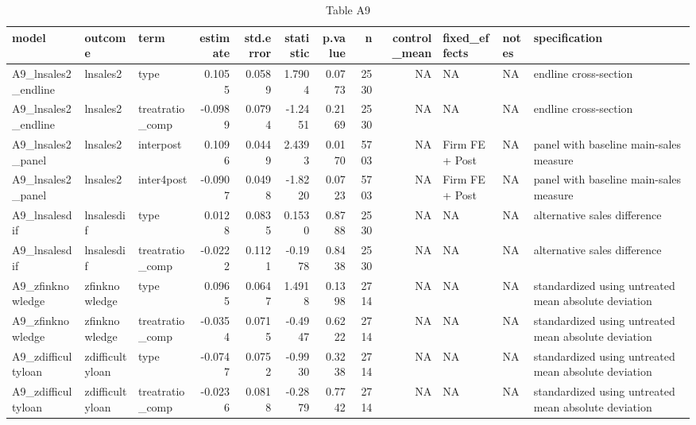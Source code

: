 \begin{table}

\caption{Table A9}
\centering
\begin{tabular}[t]{lllrrrrrrlll}
\toprule
model & outcome & term & estimate & std.error & statistic & p.value & n & control\_mean & fixed\_effects & notes & specification\\
\midrule
A9\_lnsales2\_endline & lnsales2 & type & 0.1055 & 0.0589 & 1.7904 & 0.0773 & 2530 & NA & NA & NA & endline cross-section\\
A9\_lnsales2\_endline & lnsales2 & treatratio\_comp & -0.0989 & 0.0794 & -1.2451 & 0.2169 & 2530 & NA & NA & NA & endline cross-section\\
A9\_lnsales2\_panel & lnsales2 & interpost & 0.1096 & 0.0449 & 2.4393 & 0.0170 & 5703 & NA & Firm FE + Post & NA & panel with baseline main-sales measure\\
A9\_lnsales2\_panel & lnsales2 & inter4post & -0.0907 & 0.0498 & -1.8220 & 0.0723 & 5703 & NA & Firm FE + Post & NA & panel with baseline main-sales measure\\
A9\_lnsalesdif & lnsalesdif & type & 0.0128 & 0.0835 & 0.1530 & 0.8788 & 2530 & NA & NA & NA & alternative sales difference\\
\addlinespace
A9\_lnsalesdif & lnsalesdif & treatratio\_comp & -0.0222 & 0.1121 & -0.1978 & 0.8438 & 2530 & NA & NA & NA & alternative sales difference\\
A9\_zfinknowledge & zfinknowledge & type & 0.0965 & 0.0647 & 1.4918 & 0.1398 & 2714 & NA & NA & NA & standardized using untreated mean absolute deviation\\
A9\_zfinknowledge & zfinknowledge & treatratio\_comp & -0.0354 & 0.0715 & -0.4947 & 0.6222 & 2714 & NA & NA & NA & standardized using untreated mean absolute deviation\\
A9\_zdifficultyloan & zdifficultyloan & type & -0.0747 & 0.0752 & -0.9930 & 0.3238 & 2714 & NA & NA & NA & standardized using untreated mean absolute deviation\\
A9\_zdifficultyloan & zdifficultyloan & treatratio\_comp & -0.0236 & 0.0818 & -0.2879 & 0.7742 & 2714 & NA & NA & NA & standardized using untreated mean absolute deviation\\
\bottomrule
\end{tabular}
\end{table}
